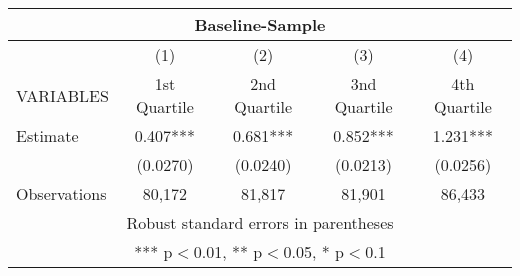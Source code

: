 \begin{tabular}{lcccc}
\multicolumn{5}{c}{Baseline-Sample} \\ \hline
 & (1) & (2) & (3) & (4) \\
VARIABLES & 1st Quartile & 2nd Quartile & 3nd Quartile & 4th Quartile \\ \hline
Estimate & 0.407*** & 0.681*** & 0.852*** & 1.231*** \\
 & (0.0270) & (0.0240) & (0.0213) & (0.0256) \\
 Observations & 80,172 & 81,817 & 81,901 & 86,433 \\ \hline
\multicolumn{5}{c}{ Robust standard errors in parentheses} \\
\multicolumn{5}{c}{ *** p$<$0.01, ** p$<$0.05, * p$<$0.1} \\
\end{tabular}
